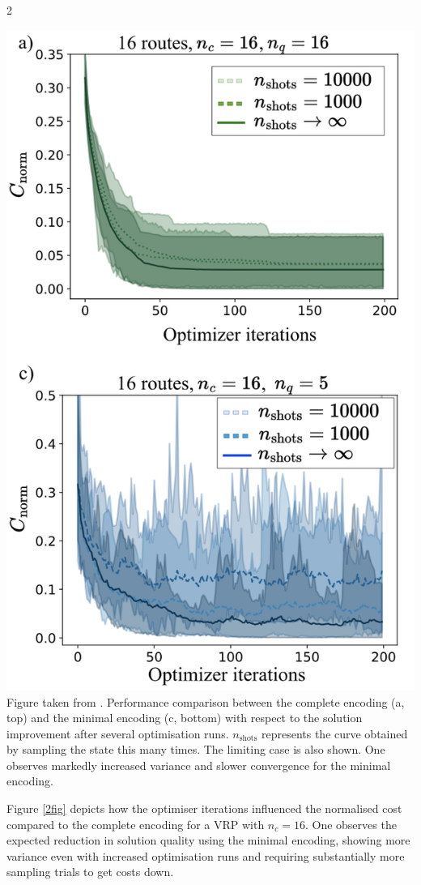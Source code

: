 \documentclass [10pt]{article}
\begin{document}
\begin {multicols}{2}
\begin {center}
\includegraphics [width=\linewidth]{2fig}
	{
	Figure taken from \cite{effvrp}. Performance comparison between the
	complete encoding (a, top) and the minimal encoding (c, bottom) with
	respect to the solution improvement after several optimisation runs.
	$n_{\text{shots}}$ represents the curve obtained by sampling the state
	this many times. The limiting case is also shown. One observes markedly
	increased variance and slower convergence for the minimal encoding.
}
\label {2fig}
\end {center}

Figure \ref{2fig} depicts
how the optimiser iterations influenced the normalised cost compared to the
complete encoding for a VRP with $n_c = 16$. One observes the
expected reduction in solution quality using the minimal encoding, showing
more variance even with increased optimisation runs and requiring substantially
more sampling trials to get costs down.


\end{multicols}
\end{document}

